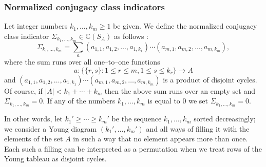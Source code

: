 \documentclass[12pt,dvips]{amsart}
\numberwithin{equation}{section} \numberwithin{figure}{section}
\theoremstyle{plain}
\theoremstyle{definition}
\theoremstyle{remark}
\newcommand{\C}{{\mathbb{C}}}
\newcommand{\Z}{{\mathbb{Z}}}
\newcommand{\Sn}[1]{{{S}}_{#1}}
\begin{document}
\subsubsection{Normalized conjugacy class indicators}
\label{subsec:definicjasigma}

Let integer numbers $k_1,\dots,k_m\geq 1$ be given. We define the
normalized conjugacy class indicator  
$\Sigma_{k_1,\dots,k_m}\in\C(\Sn{A})$ as follows
\cite{KerovOlshanski1994,BianeCharacters}:
\begin{equation}
\label{eq:definicjasigma} \Sigma_{k_1,\dots,k_m}=
\sum_{a} (a_{1,1},a_{1,2},\dots,a_{1,{k_1}}) \cdots
(a_{m,1},a_{m,2},\dots,a_{m,k_m}), \end{equation}
where the sum runs over all one--to--one functions
$$a:\big\{ \{r,s\}: 1\leq r\leq m, 1\leq s\leq {k_r}\big\}\rightarrow A$$ and
$(a_{1,1},a_{1,2},\dots,a_{1,{k_1}}) \cdots
(a_{m,1},a_{m,2},\dots,a_{m,k_m})$ is a product of disjoint cycles.
Of course, if $|A|<k_1+\cdots+k_m$ then the above sum runs over an
empty set and $\Sigma_{k_1,\dots,k_m}=0$. If any of the numbers
$k_1,\dots,k_m$ is equal to $0$ we set $\Sigma_{k_1,\dots,k_m}=0$.

In other words, let $k_1'\geq \cdots \geq k_m'$ be the sequence
$k_1,\dots,k_m$ sorted decreasingly; we consider a Young diagram
$(k_1',\dots,k_m')$ and all ways of filling it with the elements of
the set $A$ in such a way that no element appears more than once.
Each such a filling can be interpreted as a permutation when we
treat rows of the Young tableau as disjoint cycles.

\end{document}
